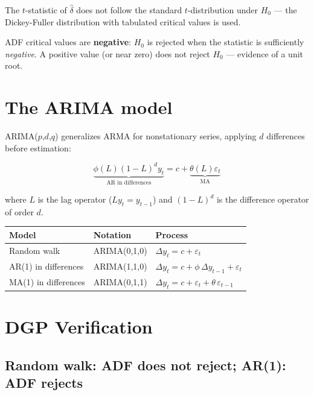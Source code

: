 The $t$-statistic of $\hat\delta$ does not follow the standard $t$-distribution under
$H_0$ --- the Dickey-Fuller distribution with tabulated critical values is used.

\begin{aviso}
  ADF critical values are \textbf{negative}: $H_0$ is rejected
  when the statistic is sufficiently \emph{negative}. A positive value
  (or near zero) does not reject $H_0$ --- evidence of a unit root.
\end{aviso}

\section{The ARIMA model}

ARIMA($p$,$d$,$q$) generalizes ARMA for nonstationary series,
applying $d$ differences before estimation:

\[
  \underbrace{\phi(L)(1-L)^d y_t}_{\text{AR in differences}}
  = c + \underbrace{\theta(L)\varepsilon_t}_{\text{MA}}
\]

where $L$ is the lag operator ($Ly_t = y_{t-1}$) and $(1-L)^d$ is the
difference operator of order $d$.

\begin{center}
\begin{tabular}{lll}
\toprule
\textbf{Model} & \textbf{Notation} & \textbf{Process} \\
\midrule
Random walk & ARIMA(0,1,0) & $\Delta y_t = c + \varepsilon_t$ \\
AR(1) in differences & ARIMA(1,1,0) & $\Delta y_t = c + \phi\,\Delta y_{t-1} + \varepsilon_t$ \\
MA(1) in differences & ARIMA(0,1,1) & $\Delta y_t = c + \varepsilon_t + \theta\,\varepsilon_{t-1}$ \\
\bottomrule
\end{tabular}
\end{center}

\section{DGP Verification}

\subsection*{Random walk: ADF does not reject; AR(1): ADF rejects}

